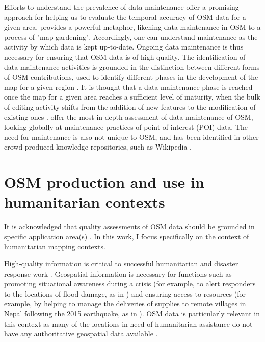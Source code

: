 Efforts to understand the prevalence of data maintenance offer a promising approach for helping us to evaluate the temporal accuracy of OSM data for a given area. \textcite{mcconchie_wiki_2013} provides a powerful metaphor, likening data maintenance in OSM to a process of "map gardening". Accordingly, one can understand maintenance as the activity by which data is kept up-to-date. Ongoing data maintenance is thus necessary for ensuring that OSM data is of high quality. The identification of data maintenance activities is grounded in the distinction between different forms of OSM contributions, used to identify different phases in the development of the map for a given region \parencite{anderson_crowd_2018}. It is thought that a data maintenance phase is reached once the map for a given area reaches a sufficient level of maturity, when the bulk of editing activity shifts from the addition of new features to the modification of existing ones \parencite{anderson_crowd_2018}. \textcite{quattrone_work_2017} offer the most in-depth assessment of data maintenance of OSM, looking globally at maintenance practices of point of interest (POI) data. The need for maintenance is also not unique to OSM, and has been identified in other crowd-produced knowledge repositories, such as Wikipedia \parencite{kittur_he_2007}. 

\section{OSM production and use in humanitarian contexts}

It is acknowledged that quality assessments of OSM data should be grounded in specific application area(s) \parencite{barron_comprehensive_2014}. In this work, I focus specifically on the context of humanitarian mapping contexts.

High-quality information is critical to successful humanitarian and disaster response work \parencite{cowan_geospatial_2011, poser_volunteered_2010, soden_infrastructure_2016, zook_volunteered_2010}. Geospatial information is necessary for functions such as promoting situational awareness during a crisis (for example, to alert responders to the locations of flood damage, as in \textcite{poser_volunteered_2010}) and ensuring access to resources (for example, by helping to manage the deliveries of supplies to remote villages in Nepal following the 2015 earthquake, as in \textcite{soden_infrastructure_2016}). OSM data is particularly relevant in this context as many of the locations in need of humanitarian assistance do not have any authoritative geospatial data available \parencite{zook_volunteered_2010}. 

